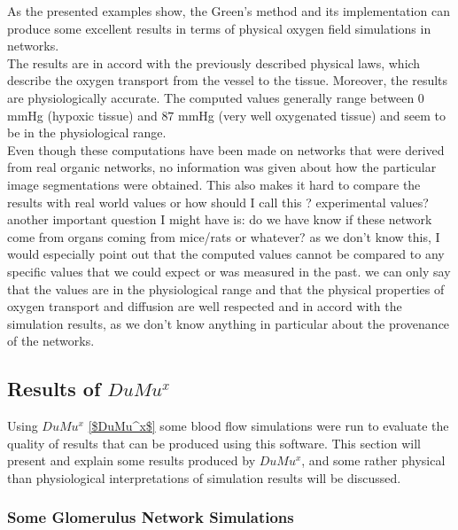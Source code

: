 As the presented examples show, the Green's method and its implementation can produce some excellent results in terms of physical oxygen field simulations in networks.
\\The results are in accord with the previously described physical laws, which describe the oxygen transport from the vessel to the tissue. Moreover, the results are physiologically accurate. The computed values generally range between $0$ mmHg (hypoxic tissue) and $87$ mmHg (very well oxygenated tissue) and seem to be in the physiological range.
\\Even though these computations have been made on networks that were derived from real organic networks, no information was given about how the particular image segmentations were obtained. This also makes it hard to compare the results with real world values {\color{red} or how should I call this ? experimental values? another important question I might have is: do we have know if these network come from organs coming from mice/rats or whatever? as we don't know this, I would especially point out that the computed values cannot be compared to any specific values that we could expect or was measured in the past. we can only say that the values are in the physiological range and that the physical properties of oxygen transport and diffusion are well respected and in accord with the simulation results}, as we don't know anything in particular about the provenance of the networks.


\subsection{Results of $DuMu^x$} 

Using $DuMu^x$ \ref{$DuMu^x$} some blood flow simulations were run to evaluate the quality of results that can be produced using this software. This section will present and explain some results produced by $DuMu^x$, and some rather physical than physiological interpretations of simulation results will be discussed.

\subsubsection*{Some Glomerulus Network Simulations}

